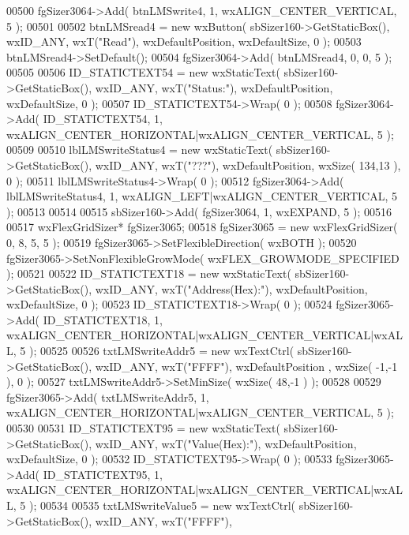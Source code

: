 \begin{DoxyCode}
00500     fgSizer3064->Add( btnLMSwrite4, 1, wxALIGN\_CENTER\_VERTICAL, 5 );
00501     
00502     btnLMSread4 = \textcolor{keyword}{new} wxButton( sbSizer160->GetStaticBox(), wxID\_ANY, wxT(\textcolor{stringliteral}{"Read"}), wxDefaultPosition, 
      wxDefaultSize, 0 );
00503     btnLMSread4->SetDefault(); 
00504     fgSizer3064->Add( btnLMSread4, 0, 0, 5 );
00505     
00506     ID_STATICTEXT54 = \textcolor{keyword}{new} wxStaticText( sbSizer160->GetStaticBox(), wxID\_ANY, wxT(\textcolor{stringliteral}{"Status:"}), 
      wxDefaultPosition, wxDefaultSize, 0 );
00507     ID_STATICTEXT54->Wrap( 0 );
00508     fgSizer3064->Add( ID_STATICTEXT54, 1, wxALIGN\_CENTER\_HORIZONTAL|wxALIGN\_CENTER\_VERTICAL, 5 );
00509     
00510     lblLMSwriteStatus4 = \textcolor{keyword}{new} wxStaticText( sbSizer160->GetStaticBox(), wxID\_ANY, wxT(\textcolor{stringliteral}{"???"}), 
      wxDefaultPosition, wxSize( 134,13 ), 0 );
00511     lblLMSwriteStatus4->Wrap( 0 );
00512     fgSizer3064->Add( lblLMSwriteStatus4, 1, wxALIGN\_LEFT|wxALIGN\_CENTER\_VERTICAL, 5 );
00513     
00514     
00515     sbSizer160->Add( fgSizer3064, 1, wxEXPAND, 5 );
00516     
00517     wxFlexGridSizer* fgSizer3065;
00518     fgSizer3065 = \textcolor{keyword}{new} wxFlexGridSizer( 0, 8, 5, 5 );
00519     fgSizer3065->SetFlexibleDirection( wxBOTH );
00520     fgSizer3065->SetNonFlexibleGrowMode( wxFLEX\_GROWMODE\_SPECIFIED );
00521     
00522     ID_STATICTEXT18 = \textcolor{keyword}{new} wxStaticText( sbSizer160->GetStaticBox(), wxID\_ANY, wxT(\textcolor{stringliteral}{"Address(Hex):"}), 
      wxDefaultPosition, wxDefaultSize, 0 );
00523     ID_STATICTEXT18->Wrap( 0 );
00524     fgSizer3065->Add( ID_STATICTEXT18, 1, wxALIGN\_CENTER\_HORIZONTAL|wxALIGN\_CENTER\_VERTICAL|wxALL, 5 );
00525     
00526     txtLMSwriteAddr5 = \textcolor{keyword}{new} wxTextCtrl( sbSizer160->GetStaticBox(), wxID\_ANY, wxT(\textcolor{stringliteral}{"FFFF"}), wxDefaultPosition
      , wxSize( -1,-1 ), 0 );
00527     txtLMSwriteAddr5->SetMinSize( wxSize( 48,-1 ) );
00528     
00529     fgSizer3065->Add( txtLMSwriteAddr5, 1, wxALIGN\_CENTER\_HORIZONTAL|wxALIGN\_CENTER\_VERTICAL, 5 );
00530     
00531     ID_STATICTEXT95 = \textcolor{keyword}{new} wxStaticText( sbSizer160->GetStaticBox(), wxID\_ANY, wxT(\textcolor{stringliteral}{"Value(Hex):"}), 
      wxDefaultPosition, wxDefaultSize, 0 );
00532     ID_STATICTEXT95->Wrap( 0 );
00533     fgSizer3065->Add( ID_STATICTEXT95, 1, wxALIGN\_CENTER\_HORIZONTAL|wxALIGN\_CENTER\_VERTICAL|wxALL, 5 );
00534     
00535     txtLMSwriteValue5 = \textcolor{keyword}{new} wxTextCtrl( sbSizer160->GetStaticBox(), wxID\_ANY, wxT(\textcolor{stringliteral}{"FFFF"}), 

\end{DoxyCode}
